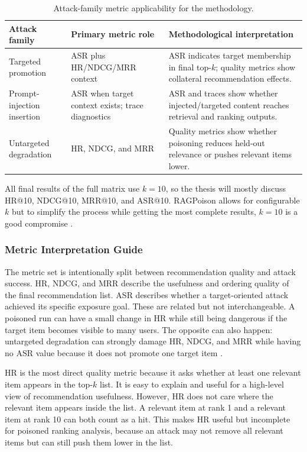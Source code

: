 \begin{table}[H]
\centering
\small
\caption{Attack-family metric applicability for the methodology.}
\label{tab:attack-metric-applicability}
\begin{tabular}{p{}p{}p{}}
\toprule
Attack family & Primary metric role & Methodological interpretation \\
\midrule
Targeted promotion & ASR plus HR/NDCG/MRR context & ASR indicates target membership in final top-$k$; quality metrics show collateral recommendation effects. \\
Prompt-injection insertion & ASR when target context exists; trace diagnostics & ASR and traces show whether injected/targeted content reaches retrieval and ranking outputs. \\
Untargeted degradation & HR, NDCG, and MRR & Quality metrics show whether poisoning reduces held-out relevance or pushes relevant items lower. \\
\bottomrule
\end{tabular}
\end{table}

All final results of the full matrix use $k=10$, so the thesis will mostly discuss HR@10, NDCG@10, MRR@10, and ASR@10. RAGPoison allows for configurable $k$ but to simplify the process while getting the most complete results, $k=10$ is a good compromise \cite{ragpoisonlab_repo}.


\subsubsection{Metric Interpretation Guide}

The metric set is intentionally split between recommendation quality and attack success. HR, NDCG, and MRR describe the usefulness and ordering quality of the final recommendation list. ASR describes whether a target-oriented attack achieved its specific exposure goal. These are related but not interchangeable. A poisoned run can have a small change in HR while still being dangerous if the target item becomes visible to many users. The opposite can also happen: untargeted degradation can strongly damage HR, NDCG, and MRR while having no ASR value because it does not promote one target item \cite{ragpoisonlab_repo,herlocker2004evaluating,wang2013ndcg}.

HR is the most direct quality metric because it asks whether at least one relevant item appears in the top-$k$ list. It is easy to explain and useful for a high-level view of recommendation usefulness. However, HR does not care where the relevant item appears inside the list. A relevant item at rank 1 and a relevant item at rank 10 can both count as a hit. This makes HR useful but incomplete for poisoned ranking analysis, because an attack may not remove all relevant items but can still push them lower in the list.

